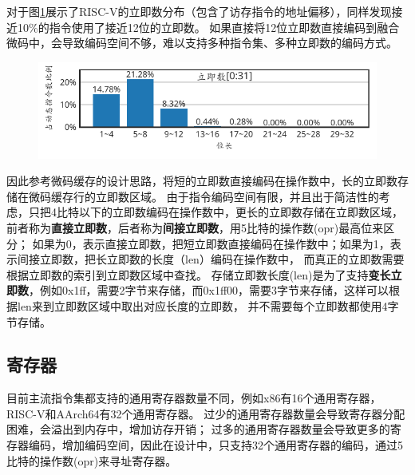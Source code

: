 对于图\ref{img:immsize_riscv}展示了RISC-V的立即数分布（包含了访存指令的地址偏移），同样发现接近10\%的指令使用了接近12位的立即数。
如果直接将12位立即数直接编码到融合微码中，会导致编码空间不够，难以支持多种指令集、多种立即数的编码方式。


\begin{figure}[h]
  \centering
  \includegraphics[width=0.8\linewidth]{./plot_pdf/immsize_riscv.pdf}
  \label{img:immsize_riscv}
\end{figure}

因此参考微码缓存的设计思路，将短的立即数直接编码在操作数中，长的立即数存储在微码缓存行的立即数区域。
由于指令编码空间有限，并且出于简洁性的考虑，只把4比特以下的立即数编码在操作数中，更长的立即数存储在立即数区域，
前者称为\textbf{直接立即数}，后者称为\textbf{间接立即数}，用5比特的操作数(opr)最高位来区分；
如果为0，表示直接立即数，把短立即数直接编码在操作数中；如果为1，表示间接立即数，把长立即数的长度（len）编码在操作数中，
而真正的立即数需要根据立即数的索引到立即数区域中查找。
存储立即数长度(len)是为了支持\textbf{变长立即数}，例如0x1ff，需要2字节来存储，而0x1ff00，需要3字节来存储，这样可以根据len来到立即数区域中取出对应长度的立即数，
并不需要每个立即数都使用4字节存储。


\subsection{寄存器}

目前主流指令集都支持的通用寄存器数量不同，例如x86有16个通用寄存器，RISC-V和AArch64有32个通用寄存器。
过少的通用寄存器数量会导致寄存器分配困难，会溢出到内存中，增加访存开销；
过多的通用寄存器数量会导致更多的寄存器编码，增加编码空间，因此在设计中，只支持32个通用寄存器的编码，通过5比特的操作数(opr)来寻址寄存器。

